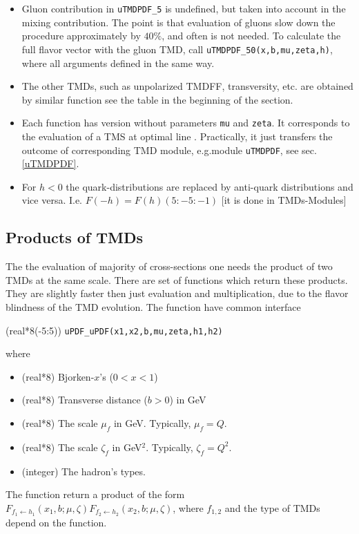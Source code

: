 \documentclass[prd,nofootinbib,eqsecnum,final]{revtex4}
\newcommand{\ot}{\leftarrow}
\renewcommand{\(}{\left(}
\renewcommand{\)}{\right)}
\renewcommand{\[}{\left[}
\renewcommand{\]}{\right]}
\begin{document}
\begin{itemize}
\item Gluon contribution in \texttt{uTMDPDF{\_}5} is undefined, but taken into account in the mixing contribution. The point is that evaluation of gluons slow down the procedure approximately by $40\%$, and often is not needed. To calculate the full flavor vector with the gluon TMD, call \texttt{uTMDPDF{\_}50(x,b,mu,zeta,h)}, where all arguments defined in the same way.

\item The other TMDs, such as unpolarized TMDFF, transversity, etc. are obtained by similar function see the table in the beginning of the section.

\item Each function has version without parameters \texttt{mu} and \texttt{zeta}. It corresponds to the evaluation of a TMS at optimal line \cite{Scimemi:2018xaf}. Practically, it just transfers the outcome of corresponding TMD module, e.g.module \texttt{uTMDPDF}, see sec.\ref{uTMDPDF}.

\item For $h<0$ the quark-distributions are replaced by anti-quark distributions and vice versa. I.e. $F(-h)=F(h)(5:-5:-1)$ [it is done in TMDs-Modules]
\end{itemize}

\subsection{Products of TMDs}
\label{TMDs:products}

The the evaluation of majority of cross-sections one needs the product of two TMDs at the same scale. There are set of functions which return these products. They are slightly faster then just evaluation and multiplication, due to the flavor blindness of the TMD evolution. The function have common interface

(real*8(-5:5)) \texttt{uPDF{\_}uPDF(x1,x2,b,mu,zeta,h1,h2)}

where
\begin{itemize}
\item [\texttt{x1,x2}] (real*8) Bjorken-$x$'s ($0<x<1$)
\item [\texttt{b}] (real*8) Transverse distance ($b>0$) in GeV
\item [\texttt{mu}] (real*8) The scale $\mu_f$ in GeV. Typically, $\mu_f=Q$.
\item [\texttt{zeta}] (real*8) The scale $\zeta_f$ in GeV$^2$. Typically, $\zeta_f=Q^2$.
\item [\texttt{h1,h2}] (integer) The hadron's types.
\end{itemize}
The function return a product of the form $F_{f_1\ot h_1}(x_1,b;\mu,\zeta)F_{f_2\ot h_2}(x_2,b;\mu,\zeta)$, where $f_{1,2}$ and the type of TMDs depend on the function.
\end{document}

